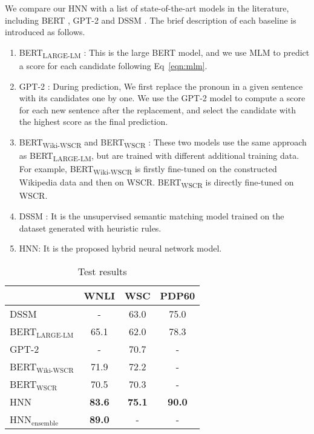 \documentclass[11pt,a4paper]{article}
\newcommand{\nmodel}{HNN}
\newcommand{\wsc}{WSC}
\begin{document}
We compare our {\nmodel} with a list of state-of-the-art models in the literature, including BERT \cite{bert2018}, GPT-2 \cite{radford2019language} and DSSM \cite{wang-etal-2019-unsupervised}. The brief description of each baseline is introduced as follows.
\begin{enumerate}
    \item BERT\textsubscript{LARGE-LM} \cite{bert2018}: This is the large BERT model, and we use MLM to predict a score for each candidate following Eq~\ref{eqn:mlm}.
    \item GPT-2 \cite{radford2019language}: During prediction, We first replace the pronoun in a given sentence with its candidates one by one.  We use the GPT-2 model to compute a score for each new sentence after the replacement, and select the candidate with the highest score as the final prediction. 
   \item BERT\textsubscript{Wiki-WSCR} and BERT\textsubscript{WSCR} \cite{kocijan2019surprisingly}: These two models use the same approach as BERT\textsubscript{LARGE-LM}, but are trained with different additional training data. For example, BERT\textsubscript{Wiki-WSCR} is firstly fine-tuned on the constructed Wikipedia data and then on WSCR. 
   BERT\textsubscript{WSCR} is directly fine-tuned on WSCR.
  \item{DSSM} \cite{wang-etal-2019-unsupervised}: It is the unsupervised semantic matching model trained on the dataset generated with heuristic rules.
  \item {\nmodel}: It is the proposed hybrid neural network model.
\end{enumerate}
\begin{table*}[htb!]
	\begin{center}
		\begin{tabular}{l |c c c} \hline
			 &WNLI & {\wsc}  & PDP60 \\ \hline \hline
			DSSM \cite{wang-etal-2019-unsupervised}    &- &63.0 & 75.0 \\  \hline \hline
            
			BERT$_{\text{LARGE-LM}}$ \cite{devlin2018bert}& 65.1 &62.0  &78.3\\ \hline
			GPT-2 \cite{radford2019language}   &- &70.7 & - \\ \hline
            BERT$_{\text{Wiki-WSCR}}$ \cite{kocijan2019surprisingly} &71.9 &72.2 & - \\ \hline	   
            BERT$_{\text{WSCR}}$ \cite{kocijan2019surprisingly} &70.5 &70.3 & - \\	    \hline \hline 
            {\nmodel} &\bf 83.6 & \bf 75.1 &  \bf 90.0\\\hline 
            {\nmodel}$_{\text{ensemble}}$ &\bf 89.0 & - &  - \\\hline
\end{tabular}
	\end{center}
    \caption{Test results}
	\label{tab:test}
\end{table*}
\end{document}
